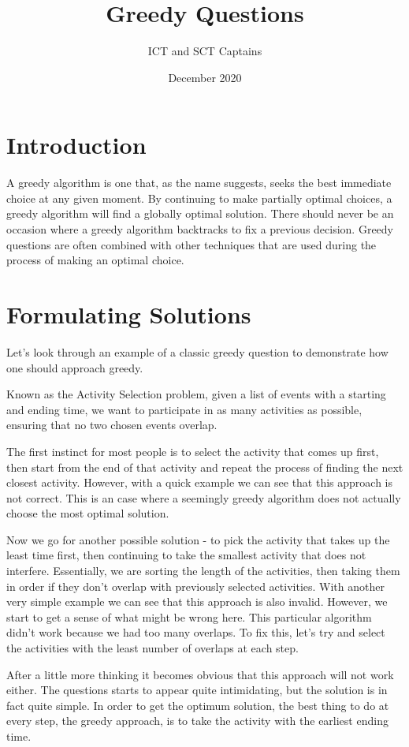 \documentclass{article}
\title{Greedy Questions}
\author{ICT and SCT Captains}
\date{December 2020}
\begin{document}
\maketitle

\section{Introduction}
    A greedy algorithm is one that, as the name suggests, seeks the best immediate choice at any given moment. By continuing to make partially optimal choices, a greedy algorithm will find a globally optimal solution.  There should never be an occasion where a greedy algorithm backtracks to fix a previous decision. Greedy questions are often combined with other techniques that are used during the process of making an optimal choice.
    
\section{Formulating Solutions}
    Let's look through an example of a classic greedy question to demonstrate how one should approach greedy.
    
    Known as the Activity Selection problem, given a list of events with a starting and ending time, we want to participate in as many activities as possible, ensuring that no two chosen events overlap.
    
    The first instinct for most people is to select the activity that comes up first, then start from the end of that activity and repeat the process of finding the next closest activity. However, with a quick example we can see that this approach is not correct. This is an case where a seemingly greedy algorithm does not actually choose the most optimal solution.
    
    Now we go for another possible solution - to pick the activity that takes up the least time first, then continuing to take the smallest activity that does not interfere. Essentially, we are sorting the length of the activities, then taking them in order if they don't overlap with previously selected activities. With another very simple example we can see that this approach is also invalid. However, we start to get a sense of what might be wrong here. This particular algorithm didn't work because we had too many overlaps. To fix this, let's try and select the activities with the least number of overlaps at each step.
    
    After a little more thinking it becomes obvious that this approach will not work either. The questions starts to appear quite intimidating, but the solution is in fact quite simple. In order to get the optimum solution, the best thing to do at every step, the greedy approach, is to take the activity with the earliest ending time.
    
\end{document}
